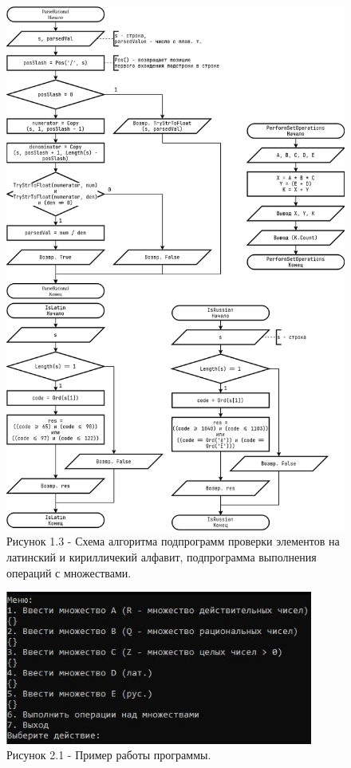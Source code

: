 \documentclass[oneside,a4paper,14pt]{extarticle}
\begin{document}
\clearpage
\begin{figure}[H]
	\centering
	\includegraphics[height=0.9\textheight]{pics/flowchart3.png}
	\caption*{Рисунок 1.3 - Схема алгоритма подпрограмм проверки элементов на латинский и кирилличекий алфавит, подпрограмма выполнения операций с множествами.}
\end{figure}

\clearpage
\begin{figure}[H]
	\centering
	\includegraphics[width=0.9\textwidth]{pics/photo1.jpg}
	\caption*{Рисунок 2.1 - Пример работы программы.}
\end{figure}
\end{document}
